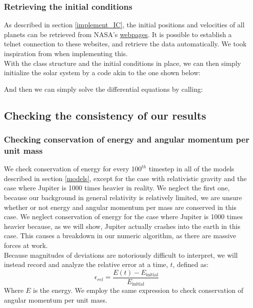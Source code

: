\documentclass[a4paper, 10pt]{article}
\begin{document}
\subsubsection{Retrieving the initial conditions}
As described in section \ref{implement_IC}, the initial positions and velocities of all planets can be retrieved from NASA's  \href{http://ssd.jpl.nasa.gov/horizons.cgi#top}{webpages}. It is possible to establish a telnet connection to these websites, and retrieve the data automatically. We took inspiration from \cite{NASA} when implementing this.\\
\linebreak
\linebreak
With the class structure and the initial conditions in place, we can then simply initialize the solar system by a code akin to the one shown below:

And then we can simply solve the differential equations by calling:

\subsection{Checking the consistency of our results}
\subsubsection{Checking conservation of energy and angular momentum per unit mass}
We check conservation of energy for every 10$0^{th}$ timestep in all of the models described in section \ref{models}, except for the case with relativistic gravity and the case where Jupiter is 1000 times heavier in reality. We neglect the first one, because our background in general relativity is relatively limited, we are unsure whether or not energy and angular momentum per mass are conserved in this case. We neglect conservation of energy for the case where Jupiter is 1000 times heavier because, as we will show, Jupiter actually crashes into the earth in this case. This causes a breakdown in our numeric algorithm, as there are massive forces at work.\\
\linebreak
Because magnitudes of deviations are notoriously difficult to interpret, we will instead record and analyze the relative error at a time, $t$, defined as:
\begin{equation}\label{eq:relative_error}
\epsilon_{rel}=\frac{E(t)-E_{\mathrm{initial}}}{E_{\mathrm{initial}}}
\end{equation}
Where $E$ is the energy. We employ the same expression to check conservation of angular momentum per unit mass.
\end{document}
